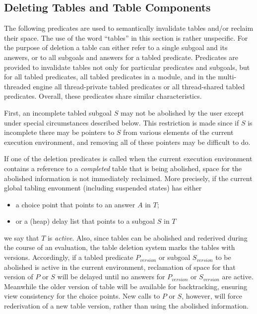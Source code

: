 \begin{description}

\subsection{Deleting Tables and Table Components}
\label{sec:TablePred:Deleting}

The following predicates are used to semantically invalidate tables
and/or reclaim their space. The use of the word ``tables'' in this
section is rather unspecific.  For the purpose of deletion a table can
either refer to a single subgoal and its answers, or to all subgoals
and answers for a tabled predicate.  Predicates are provided to
invalidate tables not only for particular predicates and subgoals, but
for all tabled predicates, all tabled predicates in a module, and in
the multi-threaded engine all thread-private tabled predicates or all
thread-shared tabled predicates.  Overall, these predicates share
similar characteristics.

First, an incomplete tabled subgoal $S$ may not be abolished by the
user except under special circumstances described below.  This
restriction is made since if $S$ is incomplete there may be pointers
to $S$ from various elements of the current execution environment, and
removing all of these pointers may be difficult to do.  

If one of the deletion predicates is called when the current execution
environment contains a reference to a {\em completed} table that is
being abolished, space for the abolished information is not
immediately reclaimed.  More precisely, if the current global tabling
envonment (including suspended states) has either
\begin{itemize}
\item a choice point that points to an answer $A$ in $T$; 
\item or a (heap) delay list that points to a subgoal $S$ in $T$
\end{itemize}
we say that $T$ is {\em active}.  Also, since tables can be abolished
and rederived during the course of an evaluation, the table deletion
system marks the tables with versions.  Accordingly, if a tabled
predicate $P_{version}$ or subgoal $S_{version}$ to be abolished is
active in the current environment, reclamation of space for that
version of $P$ or $S$ will be delayed until no answers for
$P_{version}$ or $S_{version}$ are active.  Meanwhile the older
version of table will be available for backtracking, ensuring view
consistency for the choice points.  New calls to $P$ or $S$, however,
will force rederivation of a new table version, rather than using the
abolished information.


\end{description}
